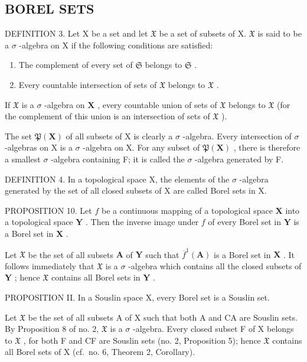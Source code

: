 \subsection{BOREL SETS}

DEFINITION 3. Let X be a set and let \(\mathfrak{X}\) be a set of subsets of X. \(\mathfrak{X}\) is said to be a \(\sigma\) -algebra on X if the following conditions are satisfied:

\begin{enumerate}
\def\labelenumi{\alph{enumi})}
\item
  The complement of every set of \(\mathfrak{S}\) belongs to \(\mathfrak{S}\) .
\item
  Every countable intersection of sets of \(\mathfrak{X}\) belongs to \(\mathfrak{X}\) .
\end{enumerate}

If \(\mathfrak{X}\) is a \(\sigma\) -algebra on \(\mathbf{X}\) , every countable union of sets of \(\mathfrak{X}\) belongs to \(\mathfrak{X}\) (for the complement of this union is an intersection of sets of \(\mathfrak{X}\) ).

The set \(\mathfrak{P}(\mathbf{X})\) of all subsets of X is clearly a \(\sigma\) -algebra. Every intersection of \(\sigma\) -algebras on X is a \(\sigma\) -algebra on X. For any subset of \(\mathfrak{P}(\mathbf{X})\) , there is therefore a smallest \(\sigma\) -algebra containing F; it is called the \(\sigma\) -algebra generated by F.

DEFINITION 4. In a topological space X, the elements of the \(\sigma\) -algebra generated by the set of all closed subsets of X are called Borel sets in X.

PROPOSITION 10. Let \(f\) be a continuous mapping of a topological space \(\mathbf{X}\) into a topological space \(\mathbf{Y}\) . Then the inverse image under \(f\) of every Borel set in \(\mathbf{Y}\) is a Borel set in \(\mathbf{X}\) .

Let \(\mathfrak{X}\) be the set of all subsets \(\mathbf{A}\) of \(\mathbf{Y}\) such that \(\overline{f}^1 (\mathbf{A})\) is a Borel set in \(\mathbf{X}\) . It follows immediately that \(\mathfrak{X}\) is a \(\sigma\) -algebra which contains all the closed subsets of \(\mathbf{Y}\) ; hence \(\mathfrak{X}\) contains all Borel sets in \(\mathbf{Y}\) .

PROPOSITION II. In a Souslin space X, every Borel set is a Souslin set.

Let \(\mathfrak{X}\) be the set of all subsets A of X such that both A and CA are Souslin sets. By Proposition 8 of no. 2, \(\mathfrak{X}\) is a \(\sigma\) -algebra. Every closed subset F of X belongs to \(\mathfrak{X}\) , for both F and CF are Souslin sets (no. 2, Proposition 5); hence \(\mathfrak{X}\) contains all Borel sets of X (cf.~no. 6, Theorem 2, Corollary).

